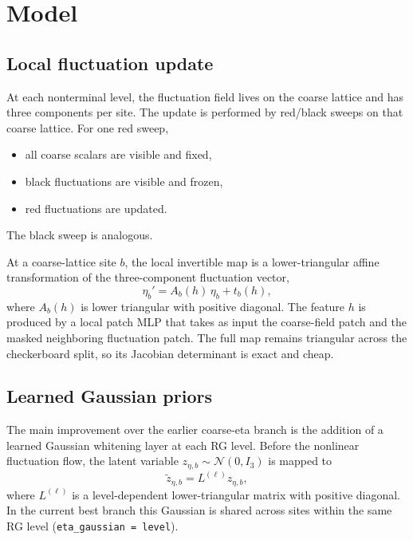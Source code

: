 \documentclass[aps,prd,preprint,nofootinbib,superscriptaddress,longbibliography]{revtex4-2}
\begin{document}
\section{Model}
\label{sec:model}

\subsection{Local fluctuation update}

At each nonterminal level, the fluctuation field lives on the coarse lattice and
has three components per site. The update is performed by red/black sweeps on
that coarse lattice. For one red sweep,
\begin{itemize}
\item all coarse scalars are visible and fixed,
\item black fluctuations are visible and frozen,
\item red fluctuations are updated.
\end{itemize}
The black sweep is analogous.

At a coarse-lattice site $b$, the local invertible map is a lower-triangular
affine transformation of the three-component fluctuation vector,
\begin{equation}
\eta_b' = A_b(h)\,\eta_b + t_b(h),
\label{eq:eta_affine}
\end{equation}
where $A_b(h)$ is lower triangular with positive diagonal. The feature $h$ is
produced by a local patch MLP that takes as input the coarse-field patch and the
masked neighboring fluctuation patch. The full map remains triangular across the
checkerboard split, so its Jacobian determinant is exact and cheap.

\subsection{Learned Gaussian priors}

The main improvement over the earlier coarse-eta branch is the addition of a
learned Gaussian whitening layer at each RG level. Before the nonlinear
fluctuation flow, the latent variable
$z_{\eta,b}\sim\mathcal{N}(0,I_3)$ is mapped to
\begin{equation}
\tilde z_{\eta,b}=L^{(\ell)} z_{\eta,b},
\end{equation}
where $L^{(\ell)}$ is a level-dependent lower-triangular matrix with positive
diagonal. In the current best branch this Gaussian is shared across sites within
the same RG level (\texttt{eta\_gaussian = level}).
\end{document}
